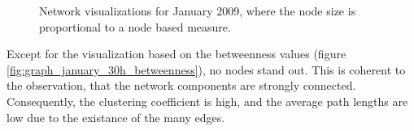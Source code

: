 \begin{figure}[htpb]
{				}
	\qquad 			
	\qquad 
		
	\caption[Network visualizations where the node size is proportional to node based measures]{Network visualizations for January 2009, where the node size is proportional to a node based measure.}
	\label{fig:graph_january_30h_node_based_measures} 
	 
\end{figure}

Except for the visualization based on the betweenness values (figure \ref{fig:graph_january_30h_betweenness}), no nodes stand out. This is coherent to the observation, that the network components are strongly connected. Consequently, the clustering coefficient is high, and the average path lengths are low due to the existance of the many edges.  

